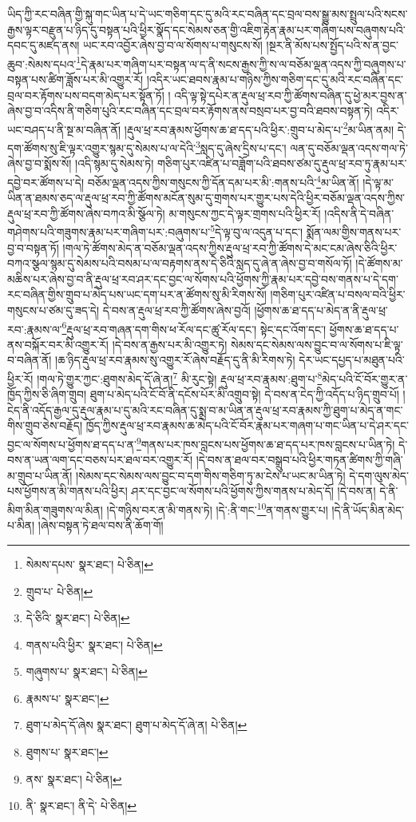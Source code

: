 ཡིད་ཀྱི་རང་བཞིན་གྱི་སྐུ་གང་ཡིན་པ་དེ་ཡང་གཅིག་དང་དུ་མའི་རང་བཞིན་དང་བྲལ་བས་སྒྱུ་མས་སྤྲུལ་པའི་སངས་རྒྱས་ལྟར་བརྫུན་པ་ཉིད་དུ་བསྟན་པའི་ཕྱིར་སྣོད་དང་སེམས་ཅན་གྱི་འཇིག་རྟེན་རྣམ་པར་གཞིག་པས་བཞུགས་པའི་དབང་དུ་མཛད་ནས། ཡང་རབ་འབྱོར་ཞེས་བྱ་བ་ལ་སོགས་པ་གསུངས་སོ། །སྔར་ནི་མོས་པས་སྤྱོད་པའི་ས་ན་བྱང་ཆུབ་:སེམས་དཔའ་\footnote{སེམས་དཔས་  སྣར་ཐང་།  པེ་ཅིན། }དེ་རྣམ་པར་གཞིག་པར་བསྟན་ལ་ད་ནི་སངས་རྒྱས་ཀྱི་ས་ལ་བཅོམ་ལྡན་འདས་ཀྱི་བཞུགས་པ་བསྟན་པས་ཚིག་ཟློས་པར་མི་འགྱུར་རོ། །འདིར་ཡང་ཐབས་རྣམ་པ་གཉིས་ཀྱིས་གཅིག་དང་དུ་མའི་རང་བཞིན་དང་བྲལ་བར་རྟོགས་པས་བདག་མེད་པར་སྟོན་ཏོ། །
འདི་ལྟ་སྟེ་དཔེར་ན་རྡུལ་ཕྲ་རབ་ཀྱི་ཚོགས་བཞིན་དུ་ཕྱེ་མར་བྱས་ན་ཞེས་བྱ་བ་འདིས་ནི་གཅིག་པུའི་རང་བཞིན་དང་བྲལ་བར་རྟོགས་ནས་བསྲབ་པར་བྱ་བའི་ཐབས་བསྟན་ཏེ། འདིར་ཡང་བཤད་པ་ནི་སྔ་མ་བཞིན་ནོ། །རྡུལ་ཕྲ་རབ་རྣམས་ཕྱོགས་ཆ་ཐ་དད་པའི་ཕྱིར་:གྲུབ་པ་མེད་པ་\footnote{གྲུབ་པ་  པེ་ཅིན། }མ་ཡིན་ནམ། དེ་དག་ཚོགས་སུ་ཇི་ལྟར་འགྱུར་སྙམ་དུ་སེམས་པ་ལ་དེའི་\footnote{དེ་ཅིའི་  སྣར་ཐང་།  པེ་ཅིན། }སླད་དུ་ཞེས་དྲིས་པ་དང་། ལན་དུ་བཅོམ་ལྡན་འདས་གལ་ཏེ་ཞེས་བྱ་བ་སྨོས་སོ། །འདི་སྙམ་དུ་སེམས་ཏེ། གཅིག་པུར་འཛིན་པ་བཟློག་པའི་ཐབས་ཙམ་དུ་རྡུལ་ཕྲ་རབ་ཏུ་རྣམ་པར་དབྱེ་བར་ཚོགས་པ་དེ། བཅོམ་ལྡན་འདས་ཀྱིས་གསུངས་ཀྱི་དོན་དམ་པར་མི་:གནས་པའི་\footnote{གནས་པའི་ཕྱིར་  སྣར་ཐང་།  པེ་ཅིན། }མ་ཡིན་ནོ། །དེ་ལྟ་མ་ཡིན་ན་ཐམས་ཅད་ལ་རྡུལ་ཕྲ་རབ་ཀྱི་ཚོགས་མངོན་སུམ་དུ་གྲགས་པར་གྱུར་པས་དེའི་ཕྱིར་བཅོམ་ལྡན་འདས་ཀྱིས་རྡུལ་ཕྲ་རབ་ཀྱི་ཚོགས་ཞེས་བཀའ་མི་སྩོལ་ཏེ། མ་གསུངས་ཀྱང་དེ་ལྟར་གྲགས་པའི་ཕྱིར་རོ། །འདིས་ནི་དེ་བཞིན་གཤེགས་པའི་གཟུགས་རྣམ་པར་གཞིག་པར་:བཞུགས་པ་\footnote{གཞུགས་པ་  སྣར་ཐང་།  པེ་ཅིན། }དེ་ལྟ་བུ་ལ་འདུན་པ་དང་། སྨོན་ལམ་གྱིས་གནས་པར་བྱ་བ་བསྟན་ཏོ། །གལ་ཏེ་ཚོགས་མེད་ན་བཅོམ་ལྡན་འདས་ཀྱིས་རྡུལ་ཕྲ་རབ་ཀྱི་ཚོགས་དེ་མང་ངམ་ཞེས་ཅིའི་ཕྱིར་བཀའ་སྩལ་སྙམ་དུ་སེམས་པའི་བསམ་པ་ལ་བརྟགས་ནས་དེ་ཅིའི་སླད་དུ་ཞེ་ན་ཞེས་བྱ་བ་གསོལ་ཏོ། །དེ་ཚོགས་མ་མཆིས་པར་ཞེས་བྱ་བ་ནི་རྡུལ་ཕྲ་རབ་ཤར་དང་བྱང་ལ་སོགས་པའི་ཕྱོགས་ཀྱི་རྣམ་པར་དབྱེ་བས་གནས་པ་དེ་དག་རང་བཞིན་གྱིས་གྲུབ་པ་མེད་པས་ཡང་དག་པར་ན་ཚོགས་སུ་མི་རིགས་སོ། །གཅིག་པུར་འཛིན་པ་བསལ་བའི་ཕྱིར་གསུངས་པ་ཙམ་དུ་ཟད་དེ། དེ་བས་ན་རྡུལ་ཕྲ་རབ་ཀྱི་ཚོགས་ཞེས་བྱའོ། །ཕྱོགས་ཆ་ཐ་དད་པ་མེད་ན་ནི་རྡུལ་ཕྲ་རབ་:རྣམས་ལ་\footnote{རྣམས་པ་  སྣར་ཐང་། }རྡུལ་ཕྲ་རབ་གཞན་དག་གིས་ཕ་རོལ་དང་ཚུ་རོལ་དང་། སྟེང་དང་འོག་དང་། ཕྱོགས་ཆ་ཐ་དད་པ་ནས་བསྐོར་བར་མི་འགྱུར་རོ། །དེ་བས་ན་རྒྱས་པར་མི་འགྱུར་ཏེ། སེམས་དང་སེམས་ལས་བྱུང་བ་ལ་སོགས་པ་ཇི་ལྟ་བ་བཞིན་ནོ། །ཆ་ཉིད་རྡུལ་ཕྲ་རབ་རྣམས་སུ་འགྱུར་རོ་ཞེས་བརྗོད་དུ་ནི་མི་རིགས་ཏེ། དེར་ཡང་དཔྱད་པ་མཐུན་པའི་ཕྱིར་རོ། །གལ་ཏེ་གྱུར་ཀྱང་:ཐུགས་མེད་དོ་ཞེ་ན།\footnote{ཐུག་པ་མེད་དོ་ཞེས  སྣར་ཐང་། ཐུག་པ་མེད་དོ་ཞེ་ན།  པེ་ཅིན། } མི་རུང་སྟེ། རྡུལ་ཕྲ་རབ་རྣམས་:ཐུག་པ་\footnote{ཐུགས་པ་  སྣར་ཐང་། }མེད་པའི་ངོ་བོར་གྱུར་ན་ཁྱོད་ཀྱིས་ཅི་ཞིག་གྲུབ། ཐུག་པ་མེད་པའི་ངོ་བོ་ནི་དངོས་པོར་མི་འགྲུབ་སྟེ། དེ་བས་ན་ངེད་ཀྱི་འདོད་པ་ཉིད་གྲུབ་པོ། །ངེད་ནི་འདོད་རྒྱལ་དུ་རྡུལ་རྣམ་པ་དུ་མའི་རང་བཞིན་དུ་སྨྲ་བ་མ་ཡིན་ན་རྡུལ་ཕྲ་རབ་རྣམས་ཀྱི་ཐུག་པ་མེད་ན་གང་གིས་གྲུབ་ཅེས་བརྗོད། ཁྱོད་ཀྱིས་རྡུལ་ཕྲ་རབ་རྣམས་ཆ་མེད་པའི་ངོ་བོར་རྣམ་པར་གཞག་པ་གང་ཡིན་པ་དེ་ཤར་དང་བྱང་ལ་སོགས་པ་ཕྱོགས་ཐ་དད་པ་ན་\footnote{ནས་  སྣར་ཐང་།  པེ་ཅིན། }གནས་པར་ཁས་བླངས་པས་ཕྱོགས་ཆ་ཐ་དད་པར་ཁས་བླངས་པ་ཡིན་ཏེ། དེ་བས་ན་ཡན་ལག་དང་བཅས་པར་ཐལ་བར་འགྱུར་རོ། །དེ་བས་ན་ཐལ་བར་བསྒྲུབ་པའི་ཕྱིར་གཏན་ཚིགས་ཀྱི་གཞི་མ་གྲུབ་པ་ཡིན་ནོ། །སེམས་དང་སེམས་ལས་བྱུང་བ་དག་གིས་གཅིག་ཏུ་མ་ངེས་པ་ཡང་མ་ཡིན་ཏེ། དེ་དག་ལུས་མེད་པས་ཕྱོགས་ན་མི་གནས་པའི་ཕྱིར། ཤར་དང་བྱང་ལ་སོགས་པའི་ཕྱོགས་ཀྱིས་གནས་པ་མེད་དོ། །དེ་བས་ན། དེ་ནི་མིག་མིན་གཟུགས་ལ་མིན། །དེ་གཉིས་བར་ན་མི་གནས་ཏེ། །དེ་:ནི་གང་\footnote{ནི་  སྣར་ཐང་། ནི་དེ་  པེ་ཅིན། }ན་གནས་གྱུར་པ། །དེ་ནི་ཡོད་མིན་མེད་པ་མིན། །ཞེས་བསྟན་ཏེ་ཐལ་བས་ནི་ཆོག་གོ། 